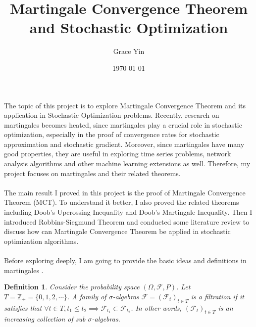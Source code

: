 \documentclass[10pt]{article}
\title{Martingale Convergence Theorem and Stochastic Optimization} %
\author{Grace Yin} %
\date{\today} %
\newtheorem{definition}{Definition}
\begin{document}
\maketitle

The topic of this project is to explore Martingale Convergence Theorem and its application in Stochastic Optimization problems. Recently, research on martingales becomes heated, since martingales play a crucial role in stochastic optimization, especially in the proof of convergence rates for stochastic approximation and stochastic gradient. Moreover, since martingales have many good properties, they are useful in exploring time series problems, network analysis algorithms and other machine learning extensions as well. Therefore, my project focuses on martingales and their related theorems.\\\\
The main result I proved in this project is the proof of Martingale Convergence Theorem (MCT). To understand it better, I also proved the related theorems including Doob's Upcrossing Inequality and Doob's Martingale Inequality. Then I introduced Robbins-Siegmund Theorem and conducted some literature review to discuss how can Martingale Convergence Theorem be applied in stochastic optimization algorithms. \\\\
Before exploring deeply, I am going to provide the basic ideas and definitions in martingales\cite{Durrett:2019} \cite{Bloem-Reddy:2019}.
\begin{definition}
Consider the probability space $(\Omega, \mathcal{F},P)$. Let $T =\mathbb{Z}_{+}=\{0,1,2,\cdots\}$. A family of $\sigma$-algebras $\mathcal{F}=(\mathcal{F}_t)_{t \in T}$ is a filtration if it satisfies that $\forall t \in T, t_1 \le t_2 \implies \mathcal{F}_{t_1} \subset \mathcal{F}_{t_2}$. In other words, $(\mathcal{F}_t)_{t \in T}$ is an increasing collection of sub $\sigma$-algebras. 
\end{definition}
\end{document}
